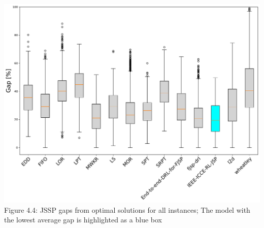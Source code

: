 \begin{center}
    \includegraphics[width=0.8\linewidth]{images/horizontal_boxplot_jssp_all.pdf}\\
    Figure 4.4: JSSP gaps from optimal solutions for all instances; The model with the lowest average gap is highlighted as a blue box
\end{center}


